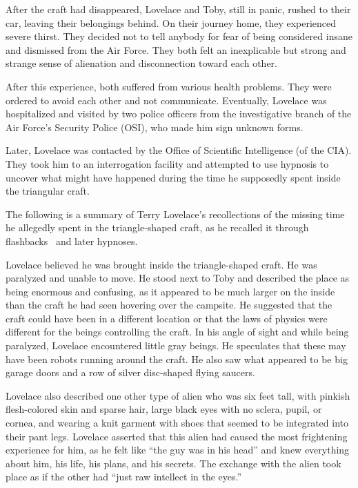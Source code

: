 After the craft had disappeared, Lovelace and Toby, still in panic, rushed to their car, leaving their belongings behind. On their journey home, they experienced severe thirst. They decided not to tell anybody for fear of being considered insane and dismissed from the Air Force. They both felt an inexplicable but strong and strange sense of alienation and disconnection toward each other.

After this experience, both suffered from various health problems. They were ordered to avoid each other and not communicate. Eventually, Lovelace was hospitalized and visited by two police officers from the investigative branch of the Air Force's Security Police (OSI), who made him sign unknown forms.

Later, Lovelace was contacted by the Office of Scientific Intelligence (of the CIA).
They took him to an interrogation facility and attempted to use hypnosis to uncover what might have happened during the time he supposedly spent inside the triangular craft.


The following is a summary of Terry Lovelace's recollections of the missing time he allegedly spent in the triangle-shaped craft,
as he recalled it through flashbacks~\cite{Lovelace18,Iandoli2023Jan} and later hypnoses.

Lovelace believed he was brought inside the triangle-shaped craft. He was paralyzed and unable to move. He stood next to Toby and described the place as being enormous and confusing, as it appeared to be much larger on the inside than the craft he had seen hovering over the campsite. He suggested that the craft could have been in a different location or that the laws of physics were different for the beings controlling the craft. In his angle of sight and while being paralyzed, Lovelace encountered little gray beings. He speculates that these may have been robots running around the craft. He also saw what appeared to be big garage doors and a row of silver disc-shaped flying saucers.

Lovelace also described one other type of alien who was six feet tall, with pinkish flesh-colored skin and sparse hair, large black eyes with no sclera, pupil, or cornea, and wearing a knit garment with shoes that seemed to be integrated into their pant legs. Lovelace asserted that this alien had caused the most frightening experience for him, as he felt like ``the guy was in his head'' and knew everything about him, his life, his plans, and his secrets. The exchange with the alien took place as if the other had ``just raw intellect in the eyes.''

